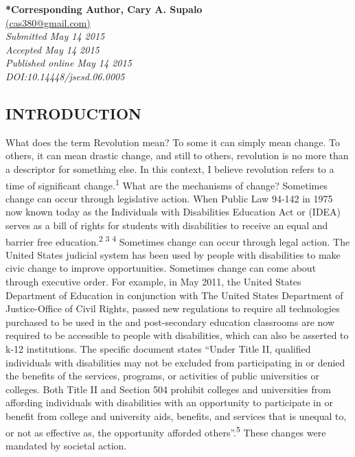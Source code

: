 \documentclass[11.5pt]{sig-alternate} %
\begin{document}
\textbf{*Corresponding Author, Cary A. Supalo}\\
\href{mailto:cas380@gmail.com }{(cas380@gmail.com)} \\
\textit{Submitted May 14 2015 }\\
\textit{Accepted May 14 2015} \\
\textit{Published online May 14 2015} \\
\textit{DOI:10.14448/jsesd.06.0005} \\
\pagebreak
\clearpage
\begin{large}

\section*{INTRODUCTION}
What does the term Revolution mean? To some it can simply mean change. To others, it can mean drastic change, and still to others, revolution is no more than a descriptor for something else. In this context, I believe revolution refers to a time of significant change.\textsuperscript{1} What are the mechanisms of change? Sometimes change can occur through legislative action. When Public Law 94-142 in 1975 now known today as the Individuals with Disabilities Education Act or (IDEA) serves as a bill of rights for students with disabilities to receive an equal and barrier free education.\textsuperscript{2 3 4} Sometimes change can occur through legal action. The United States judicial system has been used by people with disabilities to make civic change to improve opportunities. Sometimes change can come about through executive order. For example, in May 2011, the United States Department of Education in conjunction with The United States Department of Justice-Office of Civil Rights, passed new regulations to require all technologies purchased to be used in the and post-secondary education classrooms are now required to be accessible to people with disabilities, which can also be asserted to k-12 institutions. The specific document states “Under Title II, qualified individuals with disabilities may not be excluded from participating in or denied the benefits of the services, programs, or activities of public universities or colleges. Both Title II and Section 504 prohibit colleges and universities from affording individuals with disabilities with an opportunity to participate in or benefit from college and university aids, benefits, and services that is unequal to, or not as effective as, the opportunity afforded others”.\textsuperscript{5} These changes were mandated by societal action.


\end{large}
\end{document}
